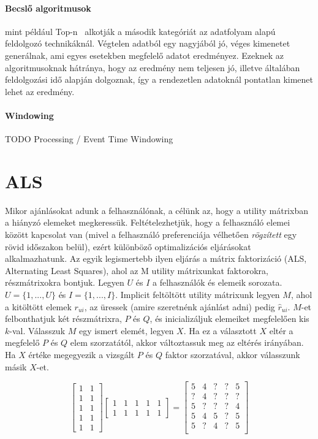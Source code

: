 \documentclass[a4paper,12pt]{article}
\begin{document}
\paragraph{Becslő algoritmusok} mint például Top-n~\cite{topn} alkotják a második kategóriát az adatfolyam alapú feldolgozó technikáknál. Végtelen adatból egy nagyjából jó, véges kimenetet generálnak, ami egyes esetekben megfelelő adatot eredményez. Ezeknek az algoritmusoknak hátránya, hogy az eredmény nem teljesen jó, illetve általában feldolgozási idő alapján dolgoznak, így a rendezetlen adatoknál pontatlan kimenet lehet az eredmény.

\paragraph{Windowing} 
TODO Processing / Event Time Windowing

\section{ALS}
Mikor ajánlásokat adunk a felhasználónak, a célünk az, hogy a utility mátrixban a hiányzó elemeket megkeressük. Feltételezhetjük, hogy a felhasználó elemei között kapcsolat van (mivel a felhasználó preferenciája vélhetően \textsl{rögzített} egy rövid időszakon belül), ezért különböző optimalizációs eljárásokat alkalmazhatunk. Az egyik legismertebb ilyen eljárás a mátrix faktorizáció (ALS, Alternating Least Squares), ahol az M utility mátrixunkat faktorokra, részmátrixokra bontjuk. \linebreak
Legyen $U$ és $I$ a felhasználók és elemeik sorozata. $U={\{1, ..., U\}}$ és $I={\{1, ..., I\}}$.  Implicit feltöltött utility mátrixunk legyen $M$, ahol a kitöltött elemek 
$r_{ui}$, az üressek (amire szeretnénk ajánlást adni) pedig $\hat{r}_{ui}$. $M$-et felbonthatjuk két részmátrixra, $P$ és $Q$, és inicializáljuk elemeiket megfelelően kis $k$-val. Válasszuk $M$ egy ismert elemét, legyen $X$. Ha ez a választott $X$ eltér a megfelelő $P$ és $Q$ elem szorzatától, akkor változtassuk meg az eltérés irányában. Ha $X$ értéke megegyezik a vizsgált $P$ és $Q$ faktor szorzatával, akkor válasszunk másik $X$-et.

\[
\begin{bmatrix}
    1 & 1 \\
    1 & 1  \\
    1 & 1  \\
    1 & 1  \\
    1 & 1          
\end{bmatrix}
%
\begin{bmatrix}
    1 & 1 & 1 & 1 & 1 \\
    1 & 1 & 1 & 1 & 1        
\end{bmatrix}
=
\begin{bmatrix}
    5 & 4 & ? & ? & 5\\
	? & 4 & ? & ? & ?\\
	5 & ? & ? & ? & 4\\
	5 & 4 & 5 & ? & 5\\
	5 & ? & 4 & ? & 5\\\end{bmatrix}
\]
\end{document}
